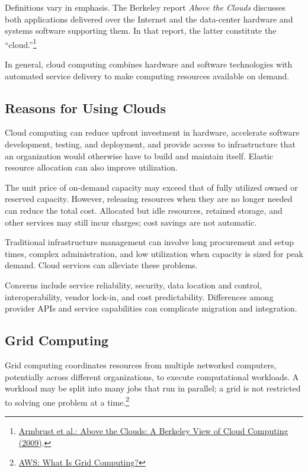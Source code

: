 Definitions vary in emphasis. The Berkeley report \emph{Above the Clouds} discusses both applications delivered over the Internet and the data-center hardware and systems software supporting them. In that report, the latter constitute the ``cloud.''\footnote{\href{https://www2.eecs.berkeley.edu/Pubs/TechRpts/2009/EECS-2009-28.html}{Armbrust et al.: Above the Clouds: A Berkeley View of Cloud Computing (2009)}.}

In general, cloud computing combines hardware and software technologies with automated service delivery to make computing resources available on demand.

\subsection{Reasons for Using Clouds}
Cloud computing can reduce upfront investment in hardware, accelerate software development, testing, and deployment, and provide access to infrastructure that an organization would otherwise have to build and maintain itself. Elastic resource allocation can also improve utilization.

The unit price of on-demand capacity may exceed that of fully utilized owned or reserved capacity. However, releasing resources when they are no longer needed can reduce the total cost. Allocated but idle resources, retained storage, and other services may still incur charges; cost savings are not automatic.

Traditional infrastructure management can involve long procurement and setup times, complex administration, and low utilization when capacity is sized for peak demand. Cloud services can alleviate these problems.

Concerns include service reliability, security, data location and control, interoperability, vendor lock-in, and cost predictability. Differences among provider APIs and service capabilities can complicate migration and integration.

\subsection{Grid Computing}
Grid computing coordinates resources from multiple networked computers, potentially across different organizations, to execute computational workloads. A workload may be split into many jobs that run in parallel; a grid is not restricted to solving one problem at a time.\footnote{\href{https://aws.amazon.com/what-is/grid-computing/}{AWS: What Is Grid Computing?}}

